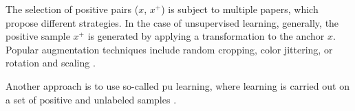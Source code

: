 The selection of positive pairs ($x$, $x^+$) is subject to multiple papers, which propose different strategies.
In the case of unsupervised learning, generally, the positive sample $x^+$ is generated by applying a transformation to the anchor $x$.
Popular augmentation techniques include random cropping, color jittering, or rotation and scaling \cite{ho_contrastive_2020,robinson_contrastive_2021}.

Another approach is to use so-called \ac{pu} learning, where learning is carried out on a set of positive and unlabeled samples \cite{chuang_debiased_2020}.